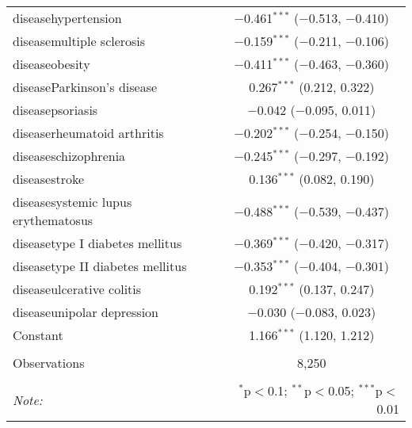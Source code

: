 \begin{table}[!htbp]
\begin{tabular}{@{\extracolsep{5pt}}lc}
  diseasehypertension & $-$0.461$^{***}$ ($-$0.513, $-$0.410) \\ 
  diseasemultiple sclerosis & $-$0.159$^{***}$ ($-$0.211, $-$0.106) \\ 
  diseaseobesity & $-$0.411$^{***}$ ($-$0.463, $-$0.360) \\ 
  diseaseParkinson's disease & 0.267$^{***}$ (0.212, 0.322) \\ 
  diseasepsoriasis & $-$0.042 ($-$0.095, 0.011) \\ 
  diseaserheumatoid arthritis & $-$0.202$^{***}$ ($-$0.254, $-$0.150) \\ 
  diseaseschizophrenia & $-$0.245$^{***}$ ($-$0.297, $-$0.192) \\ 
  diseasestroke & 0.136$^{***}$ (0.082, 0.190) \\ 
  diseasesystemic lupus erythematosus & $-$0.488$^{***}$ ($-$0.539, $-$0.437) \\ 
  diseasetype I diabetes mellitus & $-$0.369$^{***}$ ($-$0.420, $-$0.317) \\ 
  diseasetype II diabetes mellitus & $-$0.353$^{***}$ ($-$0.404, $-$0.301) \\ 
  diseaseulcerative colitis & 0.192$^{***}$ (0.137, 0.247) \\ 
  diseaseunipolar depression & $-$0.030 ($-$0.083, 0.023) \\ 
  Constant & 1.166$^{***}$ (1.120, 1.212) \\ 
 \hline \\[-1.8ex] 
Observations & 8,250 \\ 
\hline 
\hline \\[-1.8ex] 
\textit{Note:}  & \multicolumn{1}{r}{$^{*}$p$<$0.1; $^{**}$p$<$0.05; $^{***}$p$<$0.01} \\ 
\end{tabular} 
\end{table} 

